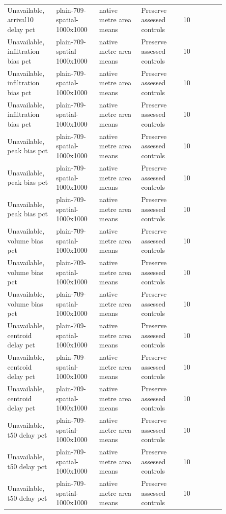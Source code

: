 \begin{longtable}{p{0.1760\linewidth}p{0.1760\linewidth}p{0.1760\linewidth}p{0.1760\linewidth}p{0.1760\linewidth}}
Unavailable, arrival10 delay pct & plain-709-spatial-1000x1000 & native metre area means & Preserve assessed controls & 10 \\
Unavailable, infiltration bias pct & plain-709-spatial-1000x1000 & native metre area means & Preserve assessed controls & 10 \\
Unavailable, infiltration bias pct & plain-709-spatial-1000x1000 & native metre area means & Preserve assessed controls & 10 \\
Unavailable, infiltration bias pct & plain-709-spatial-1000x1000 & native metre area means & Preserve assessed controls & 10 \\
Unavailable, peak bias pct & plain-709-spatial-1000x1000 & native metre area means & Preserve assessed controls & 10 \\
Unavailable, peak bias pct & plain-709-spatial-1000x1000 & native metre area means & Preserve assessed controls & 10 \\
Unavailable, peak bias pct & plain-709-spatial-1000x1000 & native metre area means & Preserve assessed controls & 10 \\
Unavailable, volume bias pct & plain-709-spatial-1000x1000 & native metre area means & Preserve assessed controls & 10 \\
Unavailable, volume bias pct & plain-709-spatial-1000x1000 & native metre area means & Preserve assessed controls & 10 \\
Unavailable, volume bias pct & plain-709-spatial-1000x1000 & native metre area means & Preserve assessed controls & 10 \\
Unavailable, centroid delay pct & plain-709-spatial-1000x1000 & native metre area means & Preserve assessed controls & 10 \\
Unavailable, centroid delay pct & plain-709-spatial-1000x1000 & native metre area means & Preserve assessed controls & 10 \\
Unavailable, centroid delay pct & plain-709-spatial-1000x1000 & native metre area means & Preserve assessed controls & 10 \\
Unavailable, t50 delay pct & plain-709-spatial-1000x1000 & native metre area means & Preserve assessed controls & 10 \\
Unavailable, t50 delay pct & plain-709-spatial-1000x1000 & native metre area means & Preserve assessed controls & 10 \\
Unavailable, t50 delay pct & plain-709-spatial-1000x1000 & native metre area means & Preserve assessed controls & 10 \\

\end{longtable}
